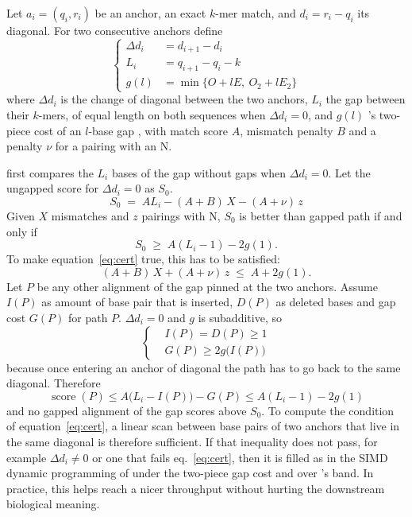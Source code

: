 Let $a_i = (q_i, r_i)$ be an anchor, an exact $k$-mer match, and $d_i = r_i - q_i$ its diagonal. For two consecutive anchors define
\begin{equation}
\left\{
\begin{aligned}
\Delta d_i &= d_{i+1} - d_i\\
L_i &= q_{i+1} - q_i - k\\
g(l) &= \min\{O + lE,\ O_2 + lE_2\}
\end{aligned}
\right.
\label{eq:gapdefs}
\end{equation}
where $\Delta d_i$ is the change of diagonal between the two anchors, $L_i$ the gap between their $k$-mers, of equal length on both sequences when $\Delta d_i = 0$, and $g(l)$ \mmtwo{}'s two-piece cost of an $l$-base gap \citep[eq.~3]{li2018minimap2}, with match score $A$, mismatch penalty $B$ and a penalty $\nu$ for a pairing with an N.

\flash{} first compares the $L_i$ bases of the gap without gaps when $\Delta d_i = 0$. Let the ungapped score for $\Delta d_i = 0$ as $S_0$.
\begin{equation}
S_0 \;=\; A L_i - (A + B)\,X - (A + \nu)\,z
\label{eq:s0}
\end{equation}
Given $X$ mismatches and $z$ pairings with N, $S_0$ is better than gapped path if and only if
\begin{equation}
S_0 \;\ge\; A(L_i - 1) - 2g(1).
\label{eq:cert}
\end{equation}
To make equation~\eqref{eq:cert} true, this has to be satisfied:
\begin{equation}
(A + B)\,X + (A + \nu)\,z \;\le\; A + 2g(1).
\label{eq:certmm}
\end{equation}
Let $P$ be any other alignment of the gap pinned at the two anchors. Assume $I(P)$ as amount of base pair that is inserted, $D(P)$ as deleted bases and gap cost $G(P)$ for path $P$. $\Delta d_i = 0$ and $g$ is subadditive, so
\begin{equation}
\left\{
\begin{aligned}
&I(P) = D(P) \ge 1\\
&G(P) \ge 2g\bigl(I(P)\bigr)
\end{aligned}
\right.
\label{eq:certproof}
\end{equation}
because once entering an anchor of diagonal the path has to go back to the same diagonal. Therefore
\begin{equation}
\operatorname{score}(P) \le A\bigl(L_i - I(P)\bigr) - G(P) \le A(L_i - 1) - 2g(1)
\label{eq:scorebound}
\end{equation}
and no gapped alignment of the gap scores above $S_0$. To compute the condition of equation~\eqref{eq:cert}, a linear scan between base pairs of two anchors that live in the same diagonal is therefore sufficient. If that inequality does not pass, for example $\Delta d_i \ne 0$ or one that fails eq.~\eqref{eq:cert}, then it is filled as in \mmtwo{} \citep[Section~2.2]{li2018minimap2} the SIMD dynamic programming of \citet{suzuki2018difference} under the two-piece gap cost and over \mmtwo{}'s band. In practice, this helps \flash{} reach a nicer throughput without hurting the downstream biological meaning.

